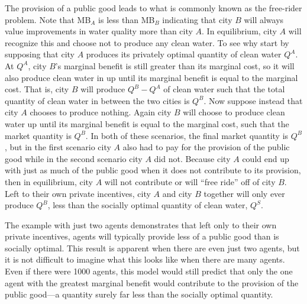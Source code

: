 The provision of a public good leads to what is commonly known as the free-rider problem. Note that MB$_A$ is less than MB$_B$ indicating that city $B$ will always value improvements in water quality more than city $A$. In equilibrium, city $A$ will recognize this and choose not to produce any clean water. To see why start by supposing that city $A$ produces its privately optimal quantity of clean water $Q^A$. At $Q^A$, city $B$'s marginal benefit is still greater than its marginal cost, so it will also produce clean water in up until its marginal benefit is equal to the marginal cost. That is, city $B$ will produce $Q^B - Q^A$ of clean water such that the total quantity of clean water in between the two cities is $Q^B$. Now suppose instead that city $A$ chooses to produce nothing. Again city $B$ will choose to produce clean water up until its marginal benefit is equal to the marginal cost, such that the market quantity is $Q^B$. In both of these scenarios, the final market quantity is $Q^B$, but in the first scenario city $A$ also had to pay for the provision of the public good while in the second scenario city $A$ did not. Because city $A$ could end up with just as much of the public good when it does not contribute to its provision, then in equilibrium, city $A$ will not contribute or will ``free ride'' off of city $B$. Left to their own private incentives, city $A$ and city $B$ together will only ever produce $Q^B$, less than the socially optimal quantity of clean water, $Q^S$. 

The example with just two agents demonstrates that left only to their own private incentives, agents will typically provide less of a public good than is socially optimal. This result is apparent when there are even just two agents, but it is not difficult to imagine what this looks like when there are many agents. Even if there were 1000 agents, this model would still predict that only the one agent with the greatest marginal benefit would contribute to the provision of the public good---a quantity surely far less than the socially optimal quantity. 


